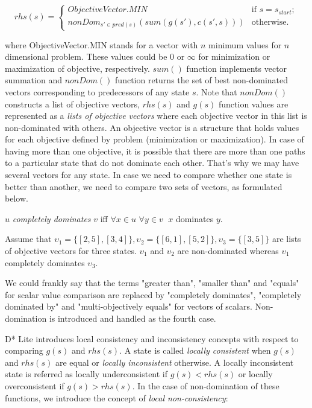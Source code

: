 \documentclass[10pt, a4paper, conference, compsocconf]{IEEEtran}
\newenvironment{definition}[1][Definition]{\begin{trivlist}
\item[\hskip \labelsep {\bfseries #1}]}{\end{trivlist}}
\begin{document}
\begin{footnotesize}
\[ rhs(s) = \left\{ \begin{array}{cc}
ObjectiveVector.MIN & \mbox{if $s=s_{start}$};\\
nonDom_{s' \in pred(s)}(sum(g(s'), c(s', s))) & \mbox{otherwise}.\end{array} \right. \] 
\end{footnotesize}

where ObjectiveVector.MIN stands for a vector with $n$ minimum values for $n$ dimensional problem. These values could be $0$ or $\infty$ for minimization or maximization of objective, respectively. $sum()$ function implements vector summation and $nonDom()$ function returns the set of best non-dominated vectors corresponding to predecessors of any state $s$. Note that $nonDom()$ constructs a list of objective vectors, $rhs(s)$ and $g(s)$ function values are represented as a \textit{lists of objective vectors} where each objective vector in this list is non-dominated with others. An objective vector is a structure that holds values for each objective defined by problem (minimization or maximization). In case of having more than one objective, it is possible that there are more than one paths to a particular state that do not dominate each other. That's why we may have several vectors for any state. In case we need to compare whether one state is better than another, we need to compare two sets of vectors, as formulated below.

\begin{definition}
$u$ \textit{completely dominates} $v$ iff $\forall x\in u$ $\forall y\in v\;$ $x$ dominates $y$.
\end{definition}

Assume that $\upsilon_{1}=\{[2,5],[3,4]\}, \upsilon_{2}=\{[6,1],[5,2]\}, \upsilon_{3}=\{[3,5]\}$ are lists of objective vectors for three states. $\upsilon_{1}$ and $\upsilon_{2}$ are non-dominated whereas $\upsilon_{1}$ completely dominates $\upsilon_{3}$. 

We could frankly say that the terms "greater than", "smaller than" and "equals" for scalar value comparison are replaced by "completely dominates", "completely dominated by" and "multi-objectively equals" for vectors of scalars. Non-domination is introduced and handled as the fourth case.

D* Lite introduces local consistency and inconsistency concepts with respect to comparing $g(s)$ and $rhs(s)$. A state is called {\it locally consistent} when $g(s)$ and $rhs(s)$ are equal or {\it locally inconsistent} otherwise. A locally inconsistent state is referred as locally underconsistent if $g(s)<rhs(s)$ or locally overconsistent if $g(s)>rhs(s)$. In the case of non-domination of these functions, we introduce the concept of {\it local non-consistency}:
\end{document}
